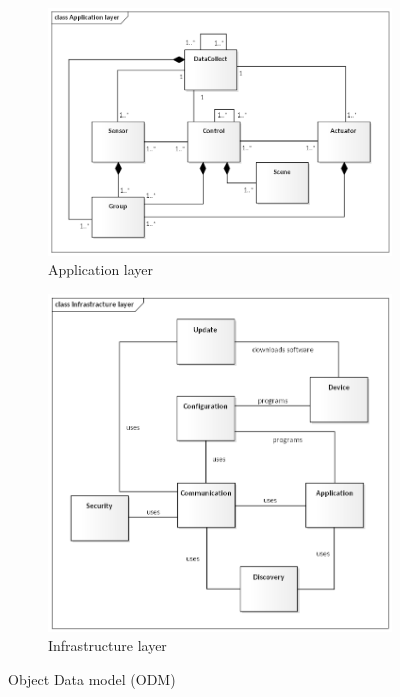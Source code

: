 \documentclass[11pt, english, a4paper, twoside]{article}
\begin{document}
\begin{figure}
	\centering
	\begin{subfigure}[b]{0.55\textwidth}
		\centering
		\includegraphics[width=\textwidth]{OpenAIS-Application-layer.png}
		\caption{Application layer}
		\label{fig:OpenAIS-Application-layer}
	\end{subfigure}
    \hfill
    \begin{subfigure}[b]{0.40\textwidth}
		\centering
		\includegraphics[width=\textwidth]{OpenAIS-Infrastracture-layer.png}
		\caption{Infrastructure layer}
		\label{fig:OpenAIS-Infrastracture-layer}
	\end{subfigure}
	\caption{Object Data model (ODM)}
	\label{fig:openais-odm}
\end{figure}
\end{document}
